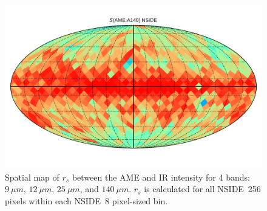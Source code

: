 {\begin{figure}
        \includegraphics[width=\textwidth/3]{../Plots/Allsky_Corr/Spearman_Map_nside8_AMEtoA140.pdf}
        \centering
        \caption{Spatial map of $r_{s}$ between the AME and IR intensity for 4 bands:$9~\mu{}m$, $12~\mu{}m$, $25~\mu{}m$, and $140~\mu{}m$. $r_{s}$ is calculated for all NSIDE~256 pixels within each NSIDE~8 pixel-sized bin.}
        \label{fig:Spearman_Map_nside8_AMEtoIR}
      \end{figure}

      \begin{figure}


\end{figure}}
